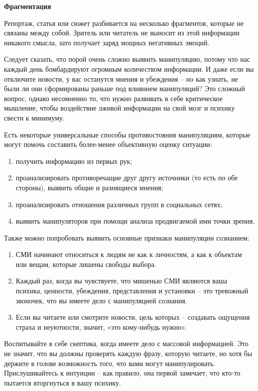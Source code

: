\textbf{Фрагментация}

Репортаж, статья или сюжет разбивается на несколько фрагментов, которые не связаны между собой. Зритель или читатель не выносит из этой информации никакого смысла, зато получает заряд мощных негативных эмоций.

Следует сказать, что порой очень сложно выявить манипуляцию, потому что нас каждый день бомбардируют огромным количеством информации. И даже если вы отключите новости, у вас останутся мнения и убеждения – но как узнать, не были ли они сформированы раньше под влиянием манипуляций? Это сложный вопрос, однако несомненно то, что нужно развивать в себе критическое мышление, чтобы воздействие лживой информации на свой мозг и психику свести к минимуму.

Есть некоторые универсальные способы противостояния манипуляциям, которые могут помочь составить более-менее объективную оценку ситуации:
\begin{enumerate}
    \item получить информацию из первых рук;
    \item проанализировать противоречащие друг другу источники (то есть по обе стороны), выявить общие и разнящиеся мнения;
    \item проанализировать отношения различных групп в социальных сетях;
    \item выявить манипуляторов при помощи анализа продвигаемой ими точки зрения.
\end{enumerate}

Также можно попробовать выявить основные признаки манипуляции сознанием:
\begin{enumerate}
    \item СМИ начинают относиться к людям не как к личностям, а как к объектам или вещам, которые лишены свободы выбора.
    \item Каждый раз, когда вы чувствуете, что мишенью СМИ являются ваша психика, ценности, убеждения, представления и установки – это тревожный звоночек, что вы имеете дело с манипуляцией сознания.
    \item Если вы читаете или смотрите новости, цель которых – создавать ощущения страха и неуютности, значит, «это кому-нибудь нужно».
\end{enumerate}

Воспитывайте в себе скептика, когда имеете дело с массовой информацией. Это не значит, что вы должны проверять каждую фразу, которую читаете, но хотя бы держите в голове возможность того, что вами могут манипулировать. Прислушивайтесь к интуиции – как правило, она первой замечает, что кто-то пытается вторгнуться в вашу психику.

